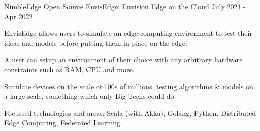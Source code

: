 \begin{cventries}


  \cventry
    {NimbleEdge Open Source} %
    {EnvisEdge: Envision Edge on the Cloud} %
    {} %
    {July 2021 - Apr 2022} %
    {
      \begin{cvitems} %
      \item {EnvisEdge allows users to simulate an edge computing environment to test their ideas and models before putting them in place on the edge.}
      \item {A user can setup an environment of their choice with any arbitrary hardware constraints such as RAM, CPU and more.}
      \item {Simulate devices on the scale of 100s of millions, testing algorithms \& models on a large scale, something which only Big Techs could do.}
      \item {Focussed technologies and areas: Scala (with Akka), Golang, Python, Distributed Edge Computing, Federated Learning.}
      \end{cvitems}
    }





\end{cventries}

